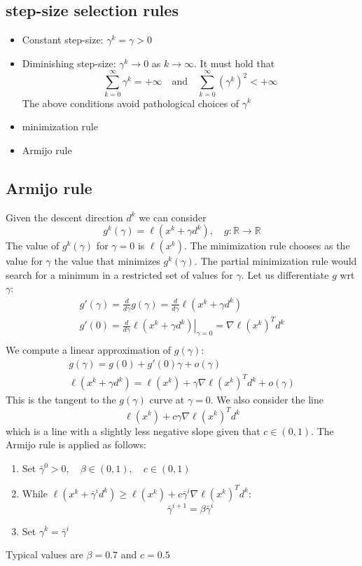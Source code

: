 \documentclass[openany]{book}
\newcommand\at[2]{\left.#1\right|_{#2}} %
\newcommand{\R}{\mathbb{R}} %
\theoremstyle{definition}
\theoremstyle{remark}
\begin{document}
\subsection{step-size selection rules}
\begin{itemize}
    \item Constant step-size: $\gamma^k=\gamma>0$
    \item Diminishing step-size: $\gamma^k\to 0$ as $k\to\infty$. It must hold that \[
            \displaystyle\sum_{k=0}^{\infty}\gamma^k = +\infty \quad \text{and} \quad \displaystyle\sum_{k=0}^{\infty}(\gamma^k)^2 < +\infty
        \]
        The above conditions avoid pathological choices of $\gamma^k$
    \item minimization rule
    \item Armijo rule
\end{itemize}

\subsection{Armijo rule}
Given the descent direction $d^k$ we can consider 
\[
    g^k(\gamma) = \ell(x^k+\gamma d^k), \quad g:\R\to\R
\]
The value of $g^k(\gamma)$ for $\gamma=0$ is $\ell(x^k)$. The minimization rule chooses as the value for $\gamma$ the value that minimizes $g^k(\gamma)$. The partial minimization rule would search for a minimum in a restricted set of values for $\gamma$. Let us differentiate $g$ wrt $\gamma$:
\begin{gather*}
    g'(\gamma)=\displaystyle\frac{d}{d\gamma}g(\gamma)=\displaystyle\frac{d}{d\gamma}\ell(x^k+\gamma d^k)\\
    g'(0) = \displaystyle\frac{d}{d\gamma}\at{\ell(x^k+\gamma d^k)}{\gamma=0} = \nabla \ell(x^k)^Td^k\\
\end{gather*}
We compute a linear approximation of $g(\gamma)$:
\begin{gather*}
    g(\gamma) = g(0) + g'(0)\gamma+o(\gamma)\\
    \ell(x^k+\gamma d^k) = \ell(x^k)+\gamma \nabla\ell(x^k)^Td^k + o(\gamma)
\end{gather*}
This is the tangent to the $g(\gamma)$ curve at $\gamma=0$. We also consider the line 
\[
    \ell(x^k)+c\gamma\nabla\ell(x^k)^Td^k
\]
which is a line with a slightly less negative slope given that $c\in(0,1)$.
The Armijo rule is applied as follows: 
\begin{enumerate}
    \item Set $\bar{\gamma}^0>0,\quad\beta\in(0,1),\quad c\in(0,1)$
    \item While $\ell(x^k+\bar{\gamma}^id^k)\geq \ell(x^k)+c\bar{\gamma}^i\nabla\ell(x^k)^Td^k$:
        \[
            \bar{\gamma}^{i+1}=\beta\bar{\gamma}^i
        \]
    \item Set $\gamma^k = \bar{\gamma}^i$
\end{enumerate}
Typical values are $\beta=0.7$ and $c=0.5$
\end{document}
